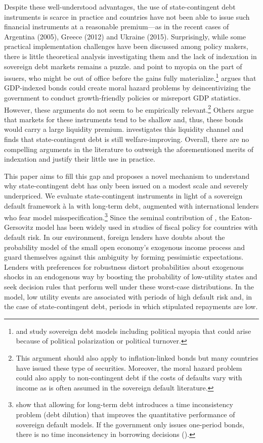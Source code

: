 Despite these well-understood advantages, the use of state-contingent debt instruments is scarce in practice and countries have not been able to issue such financial instruments at a reasonable premium---as in the recent cases of Argentina (2005), Greece (2012) and Ukraine (2015). Surprisingly, while some practical implementation challenges have been discussed among policy makers, there is little theoretical analysis investigating them and the lack of indexation in sovereign debt markets remains a puzzle. \citet{IMFpolicy2017} and \citet{voxeubook} point to myopia on the part of issuers, who might be out of office before the gains fully materialize.\footnote{\cite{Amador2012} and \cite{AguiarAmadorFourakis2020} study sovereign debt models including political myopia that could arise because of political polarization or political turnover.} \cite{Krugman88} argues that GDP-indexed bonds could create moral hazard problems by deincentivizing the government to conduct growth-friendly policies or misreport GDP statistics. However, these arguments do not seem to be empirically relevant.\footnote{This argument should also apply to inflation-linked bonds but many countries have issued these type of securities. Moreover, the moral hazard problem could also apply to non-contingent debt if the costs of defaults vary with income as is often assumed in the sovereign default literature.} Others argue that markets for these instruments tend to be shallow and, thus, these bonds would carry a large liquidity premium. \cite{Moretti2020} investigates this liquidity channel and finds that state-contingent debt is still welfare-improving. Overall, there are no compelling arguments in the literature to outweigh the aforementioned merits of indexation and justify their little use in practice.

This paper aims to fill this gap and proposes a novel mechanism to understand why state-contingent debt has only been issued on a modest scale and severely underpriced. We evaluate state-contingent instruments in light of a sovereign default framework à la \cite{Eaton81} with long-term debt, augmented with international lenders who fear model misspecification.\footnote{\cite{JIE} show that allowing for long-term debt introduces a time inconsistency problem (debt dilution) that improves the quantitative performance of sovereign default models. If the government only issues one-period bonds, there is no time inconsistency in borrowing decisions (\citealp{AguiarAmador2019}).} Since the seminal contribution of \citet{Arellano05}, the Eaton-Gersovitz model has been widely used in studies of fiscal policy for countries with default risk. In our environment, foreign lenders have doubts about the probability model of the small open economy's exogenous income process and guard themselves against this ambiguity by forming pessimistic expectations. Lenders with preferences for robustness distort probabilities about exogenous shocks in an endogenous way by boosting the probability of low-utility states and seek decision rules that perform well under these worst-case distributions. In the model, low utility events are associated with periods of high default risk and, in the case of state-contingent debt, periods in which stipulated repayments are low.

